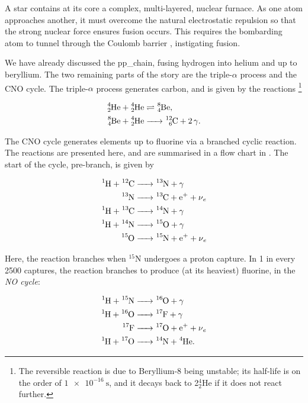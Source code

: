 \alice

A star contains at its core a complex, multi-layered, nuclear furnace. As one atom approaches another, it must overcome the natural electrostatic repulsion so that the strong nuclear force ensures fusion occurs. This requires the bombarding atom to tunnel through the Coulomb barrier \citet{Gamow:1928}, instigating fusion.

We have already discussed the \gls{pp_chain}, fusing hydrogen into helium and up to beryllium. The two remaining parts of the story are the triple-$\alpha$ process and the CNO cycle. The triple-$\alpha$ process generates carbon, and is given by the reactions \citep{Carroll:2017}\footnote{The reversible reaction is due to Beryllium-8 being unstable; its half-life is on the order of $\SI{1e-16}{\second}$, and it decays back to 2$^4_2$He if it does not react further.}

\begin{align*}
    \ce{^4_2He + ^4_2He &\rightleftharpoons ^8_4Be}, \\
    \ce{^8_4Be + ^4_2He &-> ^12_6C + 2\gamma}. \\
\end{align*}

The CNO cycle generates elements up to fluorine via a branched cyclic reaction. The reactions are presented here, and are summarised in a flow chart in . The start of the cycle, pre-branch, is given by

\begin{align*}
    \ce{^1H + ^{12}C &-> ^{13}N + \gamma} \\
    \ce{^{13}N       &-> ^{13}C + e^+ + \nu_e} \\
    \ce{^1H + ^{13}C &-> ^{14}N + \gamma} \\
    \ce{^1H + ^{14}N &-> ^{15}O + \gamma} \\
    \ce{      ^{15}O &-> ^{15}N + e^+ + \nu_e} \\
\end{align*}

Here, the reaction branches when $^{15}$N undergoes a proton capture. In 1 in every 2500 captures, the reaction branches to produce (at its heaviest) fluorine, in the \textit{NO cycle}:

\begin{align*}
    \ce{^1H + ^{15}N &-> ^{16}O + \gamma} \\
    \ce{^1H + ^{16}O &-> ^{17}F + \gamma} \\
    \ce{      ^{17}F &-> ^{17}O + e^+ + \nu_e} \\
    \ce{^1H + ^{17}O &-> ^{14}N + ^4He}. \\
\end{align*}

